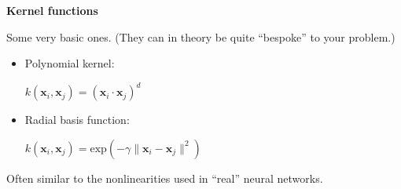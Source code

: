 \documentclass{beamer}
\newcommand{\pagestepalt}[2]{
  \begin{frame}[t]
    \begin{minipage}[t][0.26\textheight][t]{\textwidth}
      \begin{center}
        \huge
        \textbf{#1}
      \end{center}
    \end{minipage}
    
    \begin{minipage}[t][0.7\textheight][c]{\textwidth}
      #2
    \end{minipage}
  \end{frame}
}
\begin{document}
\pagestepalt{Kernel functions}{
  Some very basic ones. (They can in
  theory be quite ``bespoke'' to your problem.)
  \begin{itemize}
  \item Polynomial kernel:
    \begin{center}
      $k(\mathbf{x}_i, \mathbf{x}_j) = (\mathbf{x}_i \cdot \mathbf{x}_j)^{d}$
    \end{center}
  \item Radial basis function:
    \begin{center}
      $k(\mathbf{x}_i, \mathbf{x}_j) = \text{exp}(-\gamma\|\mathbf{x}_i - \mathbf{x}_j\|^2)$
    \end{center}
  \end{itemize}
  Often similar to the nonlinearities used in ``real'' neural networks.
}
\end{document}
